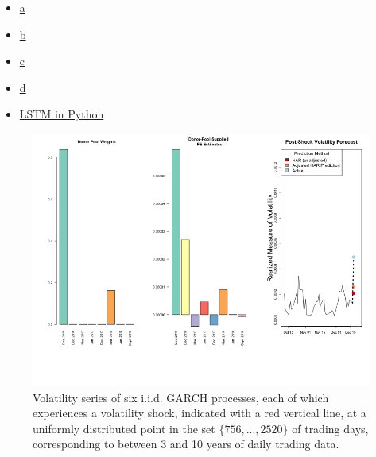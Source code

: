 \documentclass[11pt]{article}
\theoremstyle{definition}
\begin{document}
\begin{itemize}
  \item \href{https://www.r-bloggers.com/2021/04/lstm-network-in-r/#google_vignette}{a}
  \item \href{https://sharmasaravanan.medium.com/an-implementation-guide-for-lstm-in-r-2347e4118a2c}{b}
  \item \href{https://search.r-project.org/CRAN/refmans/TSdeeplearning/html/GRU_ts.html}{c}
  \item \href{https://medium.com/codex/time-series-prediction-using-lstm-in-python-19b1187f580f#:~:text=In%20conclusion%2C%20LSTM%20models%20are,in%20your%20data%20science%20toolkit.}{d}
  \item \href{https://machinelearningmastery.com/time-series-prediction-lstm-recurrent-neural-networks-python-keras/}{LSTM in Python}
\end{itemize}

\begin{figure}[h!]
  \begin{center}
    \includegraphics[scale=.4]{real_data_output_plots/savetime_SatJun151644072024__^VIX-^IRX-^XAU_^VIX_2018-12-18-2015-12-15-2016-12-13-2017-03-14-2017-06-13-2017-12-12-2018-03-20-2018-06-12-2018-09-25.png}
    \caption{Volatility series of six i.i.d. GARCH processes, each of which experiences a volatility shock, indicated with a red vertical line, at a uniformly distributed point in the set $\{756,...,2520\}$ of trading days, corresponding to between 3 and 10 years of daily trading data.}
    \label{fig:six_plots}
    \end{center}
  \end{figure}
\end{document}

